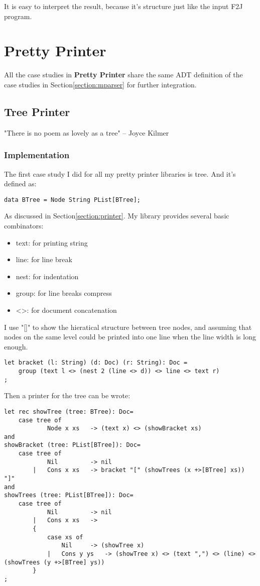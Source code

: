 It is easy to interpret the result, because it's structure just like the input F2J program.

\section{Pretty Printer}

All the case studies in \textbf{Pretty Printer} share the same ADT definition of the case studies in Section\ref{section:mparser} for further integration.

\subsection{Tree Printer}
"There is no poem as lovely as a tree" -- Joyce Kilmer
\subsubsection{Implementation}


The first case study I did for all my pretty printer libraries is tree. And it's defined as:

\begin{lstlisting}
data BTree = Node String PList[BTree];
\end{lstlisting}

As discussed in Section\ref{section:printer}. My library provides several basic combinators:
\begin{itemize}
\item text:    for printing string
\item line:    for line break
\item nest:    for indentation
\item group:   for line breaks compress
\item <>:      for document concatenation
\end{itemize}
I use "[]" to show the hieratical structure between tree nodes, and assuming that nodes on the same level could be printed into one line when the line width is long enough.
\begin{lstlisting}
let bracket (l: String) (d: Doc) (r: String): Doc =
    group (text l <> (nest 2 (line <> d)) <> line <> text r)
;
\end{lstlisting}
Then a printer for the tree can be wrote:
\begin{lstlisting}
let rec showTree (tree: BTree): Doc=
    case tree of
            Node x xs   -> (text x) <> (showBracket xs)
and
showBracket (tree: PList[BTree]): Doc=
    case tree of
            Nil         -> nil
        |   Cons x xs   -> bracket "[" (showTrees (x +>[BTree] xs)) "]"
and
showTrees (tree: PList[BTree]): Doc=
    case tree of
            Nil         -> nil
        |   Cons x xs   ->
        {
            case xs of
                Nil     -> (showTree x)
            |   Cons y ys   -> (showTree x) <> (text ",") <> (line) <> (showTrees (y +>[BTree] ys))
        }
;
\end{lstlisting}

